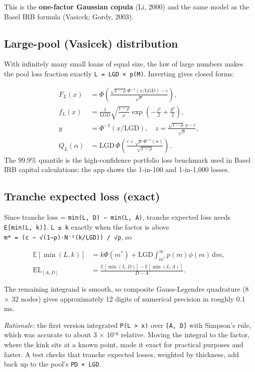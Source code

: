 \documentclass[10pt,a4paper]{article}
\numberwithin{equation}{section}
\begin{document}
This is the \textbf{one-factor Gaussian copula} (Li, 2000) and the same model as the Basel IRB formula (Vasicek; Gordy, 2003).

\subsection{Large-pool (Vasicek) distribution}\label{large-pool-vasicek-distribution}

With infinitely many small loans of equal size, the law of large numbers makes the pool loss fraction exactly \texttt{L\ =\ LGD\ ×\ p(M)}. Inverting gives closed forms:

\begin{align}
F_L(x)&=\Phi\!\left(\frac{\sqrt{1-\rho}\,\Phi^{-1}(x/\mathrm{LGD})-c}{\sqrt{\rho}}\right),\\
f_L(x)&=\frac{1}{\mathrm{LGD}}\sqrt{\frac{1-\rho}{\rho}}
\exp\!\left(-\frac{z^2}{2}+\frac{y^2}{2}\right),\\
y&=\Phi^{-1}(x/\mathrm{LGD}),\quad z=\frac{\sqrt{1-\rho}\,y-c}{\sqrt{\rho}},\\
Q_L(\alpha)&=\mathrm{LGD}\,\Phi\!\left(\frac{c+\sqrt{\rho}\,\Phi^{-1}(\alpha)}{\sqrt{1-\rho}}\right).
\end{align} The 99.9\% quantile is the high-confidence portfolio loss benchmark used in Basel IRB capital calculations; the app shows the 1-in-100 and 1-in-1,000 losses.

\subsection{Tranche expected loss (exact)}\label{tranche-expected-loss-exact}

Since tranche loss = \texttt{min(L,\ D)\ −\ min(L,\ A)}, tranche expected loss needs \texttt{E{[}min(L,\ k){]}}. \texttt{L\ ≤\ k} exactly when the factor is above \texttt{m*\ =\ (c\ −\ √(1−ρ)·N⁻¹(k/LGD))\ /\ √ρ}, so

\begin{align}
\mathbb{E}[\min(L,k)] &= k\Phi(m^*)+\mathrm{LGD}
\int_{m^*}^{\infty}p(m)\phi(m)\,\mathrm{d}m,\\
\mathrm{EL}_{[A,D]}&=\frac{\mathbb{E}[\min(L,D)]-\mathbb{E}[\min(L,A)]}{D-A}.
\end{align}

The remaining integrand is smooth, so composite Gauss-Legendre quadrature (8 × 32 nodes) gives approximately 12 digits of numerical precision in roughly 0.1 ms.

\emph{Rationale:} the first version integrated \texttt{P(L\ \textgreater{}\ x)} over \texttt{{[}A,\ D{]}} with Simpson's rule, which was accurate to about 3 × 10⁻⁶ relative. Moving the integral to the factor, where the kink sits at a known point, made it exact for practical purposes and faster. A test checks that tranche expected losses, weighted by thickness, add back up to the pool's \texttt{PD\ ×\ LGD}.
\end{document}
